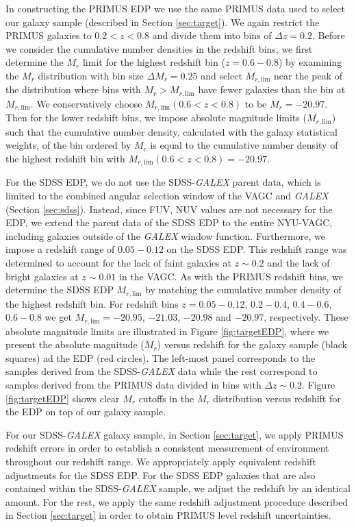 In constructing the PRIMUS EDP we use the same PRIMUS data used to select our galaxy sample (described in Section \ref{sec:target}). We again restrict the PRIMUS galaxies to $0.2 < z < 0.8$ and divide them into bins of $\Delta z = 0.2$. Before we consider the cumulative number densities in the redshift bins, we first determine the $M_r$ limit for the highest redshift bin ($z = 0.6-0.8$) by examining the $M_{r}$ distribution with bin size $\Delta M_{r} = 0.25$ and select $M_{r,\mathrm{lim}}$ near the peak of the distribution where bins with $M_{r} > M_{r,\mathrm{lim}}$ have fewer galaxies than the bin at $M_{r, \mathrm{lim}}$. We conservatively choose $M_{r, \mathrm{lim}}(0.6 < z < 0.8)$ to be $M_{r} = -20.97$. Then for the lower redshift bins, we impose absolute magnitude limits ($M_{r,\mathrm{lim}}$) such that the cumulative number density, calculated with the galaxy statistical weights, of the bin ordered by $M_{r}$ is equal to the cumulative number density of the highest redshift bin with $M_{r, \mathrm{lim}}(0.6 < z < 0.8) = -20.97$. 

For the SDSS EDP, we do not use the SDSS-{\em GALEX} parent data,
which is limited to the combined angular selection window of the
VAGC and {\em GALEX} (Section \ref{sec:sdss}). Instead, since FUV, NUV
values are not necessary for the EDP, we extend the parent data of the
SDSS EDP to the entire NYU-VAGC, including galaxies outside of the
{\em GALEX} window function. Furthermore, we impose a redshift range
of $0.05-0.12$ on the SDSS EDP. This redshift range was determined to
account for the lack of faint galaxies at $z \sim 0.2$ and the lack of
bright galaxies at $z \sim 0.01$ in the VAGC. As with the PRIMUS
redshift bins, we determine the SDSS EDP $M_{r, \mathrm{lim}}$ by matching
the cumulative number density of the highest redshift bin. For
redshift bins $z = 0.05-0.12$, $0.2-0.4$, $0.4-0.6$, $0.6-0.8$ we get
$M_{r,\mathrm{lim}} = -20.95$, $-21.03$, $-20.98$ and $-20.97$,
respectively. These absolute magnitude limits are illustrated in
Figure \ref{fig:targetEDP}, where we present the absolute magnitude ($M_{r}$) versus redshift for the galaxy sample (black squares) ad the EDP (red circles). 
The left-most panel corresponds to the samples derived from the SDSS-{\em GALEX} data while the rest correspond to samples derived from the PRIMUS data divided in bins with $\Delta z \sim 0.2$. 
Figure \ref{fig:targetEDP} shows clear $M_r$ cutoffs in the
$M_{r}$ distribution versus redshift for the EDP on top
of our galaxy sample.

For our SDSS-{\em GALEX} galaxy sample, in Section \ref{sec:target}, we apply PRIMUS redshift errors in order to establish a consistent measurement of environment throughout our redshift range. We appropriately apply equivalent redshift adjustments for the SDSS EDP. For the SDSS EDP galaxies that are also contained within the SDSS-{\em GALEX} sample, we adjust the redshift by an identical amount. For the rest, we apply the same redshift adjustment procedure described in Section \ref{sec:target} in order to obtain PRIMUS level redshift uncertainties. 

